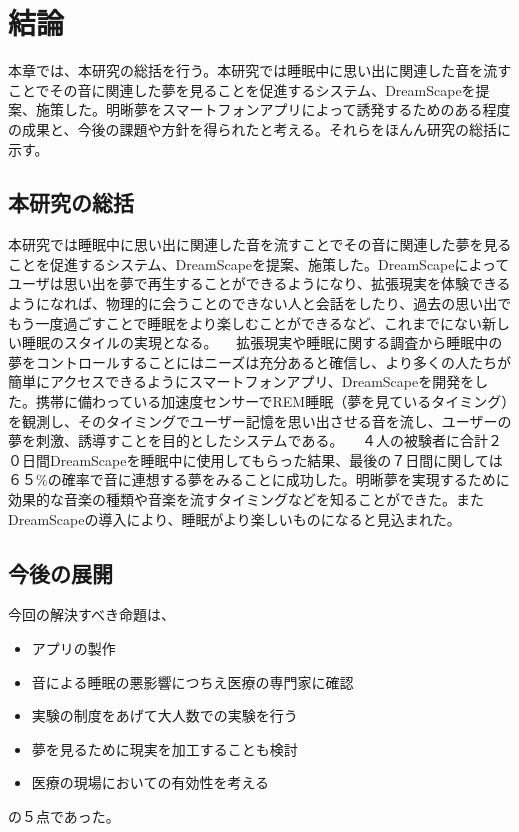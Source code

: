 \chapter{結論}
\label{chap:result}

本章では、本研究の総括を行う。本研究では睡眠中に思い出に関連した音を流すことでその音に関連した夢を見ることを促進するシステム、DreamScapeを提案、施策した。明晰夢をスマートフォンアプリによって誘発するためのある程度の成果と、今後の課題や方針を得られたと考える。それらをほんん研究の総括に示す。

\section{本研究の総括}
本研究では睡眠中に思い出に関連した音を流すことでその音に関連した夢を見ることを促進するシステム、DreamScapeを提案、施策した。DreamScapeによってユーザは思い出を夢で再生することができるようになり、拡張現実を体験できるようになれば、物理的に会うことのできない人と会話をしたり、過去の思い出でもう一度過ごすことで睡眠をより楽しむことができるなど、これまでにない新しい睡眠のスタイルの実現となる。
　拡張現実や睡眠に関する調査から睡眠中の夢をコントロールすることにはニーズは充分あると確信し、より多くの人たちが簡単にアクセスできるようにスマートフォンアプリ、DreamScapeを開発をした。携帯に備わっている加速度センサーでREM睡眠（夢を見ているタイミング）を観測し、そのタイミングでユーザー記憶を思い出させる音を流し、ユーザーの夢を刺激、誘導すことを目的としたシステムである。
　４人の被験者に合計２０日間DreamScapeを睡眠中に使用してもらった結果、最後の７日間に関しては６５\%の確率で音に連想する夢をみることに成功した。明晰夢を実現するために効果的な音楽の種類や音楽を流すタイミングなどを知ることができた。またDreamScapeの導入により、睡眠がより楽しいものになると見込まれた。


\section{今後の展開}
今回の解決すべき命題は、
\begin{itemize}
\item アプリの製作
\item 音による睡眠の悪影響につちえ医療の専門家に確認
\item 実験の制度をあげて大人数での実験を行う
\item 夢を見るために現実を加工することも検討
\item 医療の現場においての有効性を考える
\end{itemize}
の５点であった。

